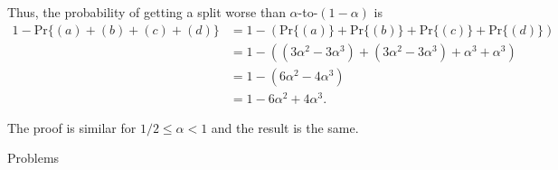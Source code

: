 \begin{enumerate}
\begin{framed}
Thus, the probability of getting a split worse than $\alpha$-to-$(1 - \alpha)$ is
\begin{equation*}
\begin{aligned}
  1 - \text{Pr}\{(a) + (b) + (c) + (d)\}
  &= 1 - \left(\text{Pr}\{(a)\} + \text{Pr}\{(b)\} + \text{Pr}\{(c)\} + \text{Pr}\{(d)\}\right)\\
  &= 1 - \left((3 \alpha^2 - 3 \alpha^3) + (3 \alpha^2 - 3 \alpha^3) + \alpha^3 + \alpha^3\right)\\
  &= 1 - (6 \alpha^2 - 4 \alpha^3)\\
  &= 1 - 6 \alpha^2 + 4 \alpha^3.
\end{aligned}
\end{equation*}

The proof is similar for $1/2 \le \alpha < 1$ and the result is the same.
\end{framed}

\end{enumerate}

\newpage

{\large Problems}

